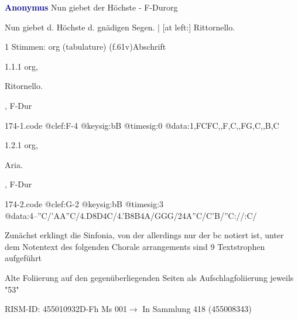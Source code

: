 \documentclass[twocolumn]{book}
\begin{document}
\par \vspace{7pt} \textcolor{darkblue}{\textbf{Anonymus  }}\hfillplus{\textbf{[174]}}\newline Nun giebet der Höchste - F-Dur\newline org
\par \begin{itshape}[heading, f.61v:] Nun giebet d. Höchste d. gnädigen Segen. | [at left:] Rittornello.\end{itshape} 
\par \textcolor{darkblue}{}  1 Stimmen: org (tabulature)  (f.61v)\newline Abschrift
\par 1.1.1  org, \begin{itshape}Ritornello.\end{itshape}, F-Dur  
\begin{filecontents*}{174-1.code}
@clef:F-4
@keysig:bB
@timesig:0
@data:1,FCFC,,F,C,,FG,C,,B,C
\end{filecontents*}
\newline
%
\par 1.2.1  org, \begin{itshape}Aria.\end{itshape}, F-Dur  
\begin{filecontents*}{174-2.code}
@clef:G-2
@keysig:bB
@timesig:3
@data:4--''C/'AA''C/4.D8D4C/4.'B8B4A/GGG/24A''C/C'B/''C://:C/
\end{filecontents*}
\newline
%
\par Zunächst erklingt die Sinfonia, von der allerdings nur der bc notiert ist, unter dem Notentext des folgenden Chorale arrangements sind 9 Textstrophen aufgeführt
\par Alte Foliierung auf den gegenüberliegenden Seiten als Aufschlagfoliierung jeweils "53"
\par RISM-ID: 455010932\newline D-Fh  Ms 001\newline $\rightarrow$ In Sammlung 418 (455008343)
      
\end{document}
